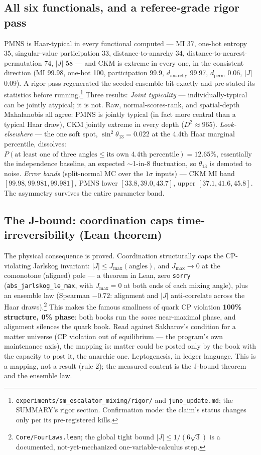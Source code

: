 \documentclass[11pt,a4paper]{article}
\begin{document}
\subsection*{All six functionals, and a referee-grade rigor pass}

PMNS is Haar-typical in every functional computed --- MI 37, one-hot entropy 35, singular-value participation 33, distance-to-anarchy 34, distance-to-nearest-permutation 74, $|J|$ 58 --- and CKM is extreme in every one, in the consistent direction (MI 99.98, one-hot 100, participation 99.9, $d_{\text{anarchy}}$ 99.97, $d_{\text{perm}}$ 0.06, $|J|$ 0.09). A rigor pass regenerated the seeded ensemble bit-exactly and pre-stated its statistics before running.\footnote{\texttt{experiments/sm\_escalator\_mixing/rigor/} and \texttt{juno\_update.md}; the SUMMARY's rigor section. Confirmation mode: the claim's status changes only per its pre-registered kills.} Three results: \emph{Joint typicality} --- individually-typical can be jointly atypical; it is not. Raw, normal-scores-rank, and spatial-depth Mahalanobis all agree: PMNS is jointly typical (in fact more central than a typical Haar draw), CKM jointly extreme in every depth ($D^2 \approx 965$). \emph{Look-elsewhere} --- the one soft spot, $\sin^2\theta_{13} = 0.022$ at the 4.4th Haar marginal percentile, dissolves: $P(\text{at least one of three angles} \le \text{its own 4.4th percentile}) = 12.65\%$, essentially the independence baseline, an expected $\sim$1-in-8 fluctuation, so $\theta_{13}$ is demoted to noise. \emph{Error bands} (split-normal MC over the $1\sigma$ inputs) --- CKM MI band $[99.98, 99.981, 99.981]$, PMNS lower $[33.8, 39.0, 43.7]$, upper $[37.1, 41.6, 45.8]$. The asymmetry survives the entire parameter band.

\subsection*{The J-bound: coordination caps time-irreversibility (Lean theorem)}

The physical consequence is proved. Coordination structurally caps the CP-violating Jarlskog invariant: $|J| \le J_{\max}(\text{angles})$, and $J_{\max} \to 0$ at the comonotone (aligned) pole --- a theorem in Lean, zero \texttt{sorry} (\texttt{abs\_jarlskog\_le\_max}, with $J_{\max} = 0$ at both ends of each mixing angle), plus an ensemble law (Spearman $-0.72$: alignment and $|J|$ anti-correlate across the Haar draws).\footnote{\texttt{Core/FourLaws.lean}; the global tight bound $|J| \le 1/(6\sqrt3)$ is a documented, not-yet-mechanized one-variable-calculus step.} This makes the famous smallness of quark CP violation \textbf{100\% structure, 0\% phase}: both books run the \emph{same} near-maximal phase, and alignment silences the quark book. Read against Sakharov's condition for a matter universe (CP violation out of equilibrium --- the program's own maintenance axis), the mapping is: matter could be posted only by the book with the capacity to post it, the anarchic one. Leptogenesis, in ledger language. This is a mapping, not a result (rule 2); the measured content is the J-bound theorem and the ensemble law.
\end{document}
